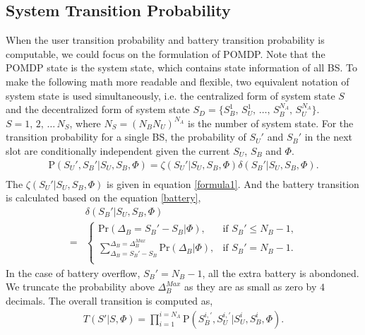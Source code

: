 \documentclass[conference]{IEEEtran}
\begin{document}
\subsection{System Transition Probability}
When the user transition probability and battery transition probability is computable,
we could focus on the formulation of POMDP.
Note that the POMDP state is the system state, which contains state information of all BS.
To make the following math more readable and flexible,
two equivalent notation of system state is used simultaneously, i.e.
the centralized form of system state \(S\) and
the decentralized form of system state \(S_D = \{S_B^1,\,S_U^1,\,\ldots,\,S_B^{N_A},\,S_U^{N_A}\}\).
\(S = 1,\,2,\, \ldots\,N_S\), where \(N_S = \left(N_BN_U\right)^{N_A}\) is the number of system state.
For the transition probability for a single BS,
the probability of \(S_U'\) and \(S_B'\) in the next slot are conditionally independent
given the current \(S_U\), \(S_B\) and \(\Phi\).
\begin{equation}
\begin{aligned}
	\mbox{P}\left(S_U',S_B'|S_U,S_B,\Phi\right) =
	\zeta\left(S_U'|S_U, S_B, \Phi\right) \delta\left(S_B'|S_U, S_B, \Phi\right).\\
\end{aligned}
\end{equation}
The \(\zeta\left(S_U'|S_U, S_B, \Phi\right)\) is given in equation \eqref{formula1}.
And the battery transition is calculated based on the equation \eqref{battery},
\begin{align}
	&\delta\left(S_B'|S_U, S_B, \Phi\right)\nonumber\\
	= &
	\begin{cases}
		\mbox{Pr}\left(\Delta_B = S_B' - S_B|\Phi \right), &\mbox{if $S_B' \le N_B - 1$,}\\
		\sum_{\Delta_B = S_B' - S_B}^{\Delta_B = \Delta_B^{Max}}\mbox{Pr}\left(\Delta_B|\Phi\right),
		&\mbox{if $S_B' = N_B - 1$.}\\
\end{cases}
\end{align}
In the case of battery overflow, \(S_B'=N_B - 1\), all the extra battery is abondoned.
We truncate the probability above \(\Delta_B^{Max}\) as they are as small as zero by \(4\) decimals.
The overall transition is computed as,
\begin{align}\label{transition}
	T\left(S'|S,\Phi\right) = \prod_{i = 1}^{i = N_A}\mbox{P}\left(S_B^{i,'}, S_U^{i,'}|S_U^i, S_B^i, \Phi\right).
\end{align}
\end{document}
